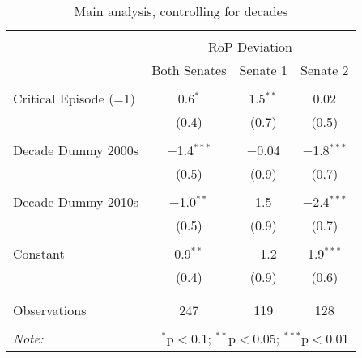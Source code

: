 
\begin{table}[!htbp] \centering 
  \caption{Main analysis, controlling for decades} 
  \label{rob_decade_conf} 
\begin{tabular}{@{\extracolsep{5pt}}lccc} 
\\[-1.8ex]\hline 
\hline \\[-1.8ex] 
 & \multicolumn{3}{c}{RoP Deviation} \\ 
\cline{2-4} 
 & Both Senates & Senate 1 & Senate 2 \\ 
\hline \\[-1.8ex] 
 Critical Episode (=1) & 0.6$^{*}$ & 1.5$^{**}$ & 0.02 \\ 
  & (0.4) & (0.7) & (0.5) \\ 
  & & & \\ 
 Decade Dummy 2000s & $-$1.4$^{***}$ & $-$0.04 & $-$1.8$^{***}$ \\ 
  & (0.5) & (0.9) & (0.7) \\ 
  & & & \\ 
 Decade Dummy 2010s & $-$1.0$^{**}$ & 1.5 & $-$2.4$^{***}$ \\ 
  & (0.5) & (0.9) & (0.7) \\ 
  & & & \\ 
 Constant & 0.9$^{**}$ & $-$1.2 & 1.9$^{***}$ \\ 
  & (0.4) & (0.9) & (0.6) \\ 
  & & & \\ 
\hline \\[-1.8ex] 
Observations & 247 & 119 & 128 \\ 
\hline 
\hline \\[-1.8ex] 
\textit{Note:}  & \multicolumn{3}{r}{$^{*}$p$<$0.1; $^{**}$p$<$0.05; $^{***}$p$<$0.01} \\ 
\end{tabular} 
\end{table} 
